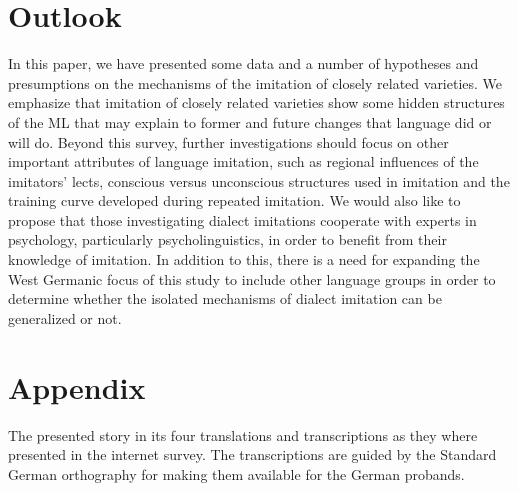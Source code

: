 \documentclass[output=paper]{LSP/langsci}
\begin{document}
 \section{Outlook}\label{outlook}

In this paper, we have presented some data and a number of hypotheses and presumptions on the mechanisms of the imitation of closely related varieties. We emphasize that imitation of closely related varieties  show some hidden structures of the ML that may explain to former and future changes that language did or will do.  Beyond this survey, further investigations should focus on other important attributes of language imitation, such as regional influences of the imitators’ lects, conscious versus unconscious structures used in imitation and the training curve developed during repeated imitation. We would also like to propose that those investigating dialect imitations cooperate with experts in psychology, particularly psycholinguistics, in order to benefit from their knowledge of imitation. In addition to this, there is a need for expanding the West Germanic focus of this study to include other language groups in order to determine whether the isolated mechanisms of dialect imitation can be generalized or not.

\section{Appendix}\label{appendix}

The presented story in its four translations and transcriptions as they where presented in the internet survey. The transcriptions are guided by the Standard German orthography for making them available for the German probands.\\
\end{document}

